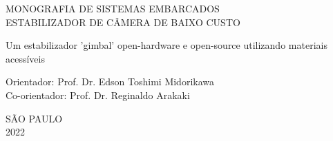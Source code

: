 \begin{titlepage}
\vfill
\begin{center}
    \vspace{2cm}
    {\Large \textsc{MONOGRAFIA DE SISTEMAS EMBARCADOS\\
    ESTABILIZADOR DE CÂMERA DE BAIXO CUSTO}\\}
    \vspace{1cm}
    \hspace{.45\linewidth}
    \begin{minipage}{.50\linewidth}

            Um estabilizador 'gimbal' open-hardware e open-source utilizando materiais acessíveis

            \vspace{0.5 cm}

            Orientador:     Prof. Dr. Edson Toshimi Midorikawa\\
            Co-orientador: Prof. Dr. Reginaldo Arakaki\\
    
    \end{minipage}

    \vspace{2cm}
    \vfill
    {\large SÃO PAULO\\ 2022}
\end{center}

\end{titlepage}